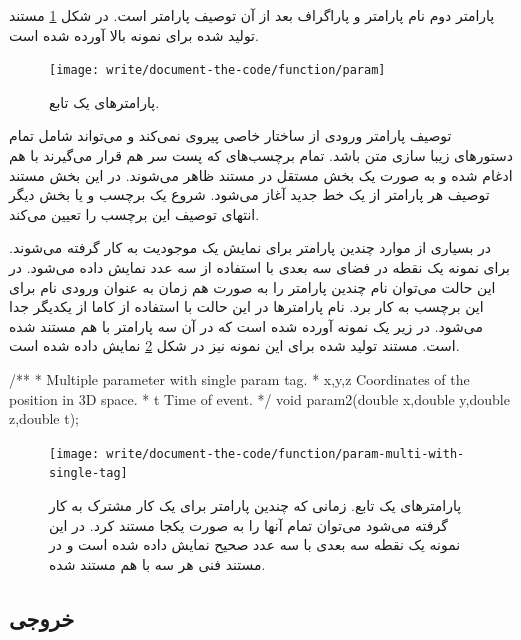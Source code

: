 پارامتر دوم نام پارامتر و پاراگراف بعد از آن توصیف پارامتر است. در شکل
\ref{write/document-the-code/function/param} مستند تولید شده برای نمونه
بالا آورده شده است.
\begin{figure}
	\centering
	\texttt{[image: write/document-the-code/function/param]}
	\caption[پارامترهای یک تابع]{
		پارامترهای یک تابع.
	}
	\label{write/document-the-code/function/param}
\end{figure}

توصیف پارامتر ورودی از ساختار خاصی پیروی نمی‌کند و می‌تواند شامل تمام دستورهای
زیبا سازی متن باشد.
تمام برچسب‌های  که پست سر هم قرار می‌گیرند با هم ادغام شده و به صورت یک 
بخش مستقل در مستند ظاهر می‌شوند.
در این بخش مستند توصیف هر پارامتر از یک خط جدید آغاز می‌شود.
شروع یک برچسب و یا بخش دیگر انتهای توصیف این برچسب را تعیین می‌کند.

در بسیاری از موارد چندین پارامتر برای نمایش یک موجودیت به کار گرفته می‌شوند.
برای نمونه یک نقطه در فضای سه بعدی با استفاده از سه عدد نمایش داده می‌شود.
در این حالت می‌توان نام چندین پارامتر را به صورت هم زمان به عنوان ورودی نام 
برای این برچسب به کار برد.
نام پارامترها در این حالت با استفاده از کاما از یکدیگر جدا می‌شود.
در زیر یک نمونه آورده شده است که در آن سه پارامتر با هم مستند شده است.
مستند تولید شده برای این نمونه نیز در شکل 
\ref{write/document-the-code/function/param-multi-with-single-tag} نمایش داده شده است.
\begin{C++}
/**
 * \brief Multiple parameter with single param tag.
 * \param x,y,z Coordinates of the position in 3D space.
 * \param t     Time of event.
 */
void param2(double x,double y,double z,double t);
\end{C++}

\begin{figure}
	\centering
	\texttt{[image: write/document-the-code/function/param-multi-with-single-tag]}
	\caption[پارامترهای یک تابع]{
		پارامترهای یک تابع. زمانی که چندین پارامتر برای یک کار مشترک به کار گرفته می‌شود
		می‌توان تمام آنها را به صورت یکجا مستند کرد. در این نمونه یک نقطه سه بعدی با سه 
		عدد صحیح نمایش داده شده است و در مستند فنی هر سه با هم مستند شده.
	}
	\label{write/document-the-code/function/param-multi-with-single-tag}
\end{figure}



\subsection{خروجی}

